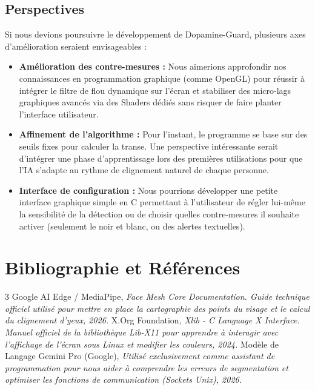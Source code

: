 \documentclass[a4paper, 12pt, twoside]{article}
\begin{document}
\subsection{Perspectives}
Si nous devions poursuivre le développement de Dopamine-Guard, plusieurs axes d'amélioration seraient envisageables :
\begin{itemize}
    \item \textbf{Amélioration des contre-mesures :} Nous aimerions approfondir nos connaissances en programmation graphique (comme OpenGL) pour réussir à intégrer le filtre de flou dynamique sur l'écran et stabiliser des micro-lags graphiques avancés via des Shaders dédiés sans risquer de faire planter l'interface utilisateur.
    \item \textbf{Affinement de l'algorithme :} Pour l'instant, le programme se base sur des seuils fixes pour calculer la transe. Une perspective intéressante serait d'intégrer une phase d'apprentissage lors des premières utilisations pour que l'IA s'adapte au rythme de clignement naturel de chaque personne.
    \item \textbf{Interface de configuration :} Nous pourrions développer une petite interface graphique simple en C permettant à l'utilisateur de régler lui-même la sensibilité de la détection ou de choisir quelles contre-mesures il souhaite activer (seulement le noir et blanc, ou des alertes textuelles).
\end{itemize}

\newpage

\section{Bibliographie et Références}
\begin{thebibliography}{3}
    Google AI Edge / MediaPipe, {\it Face Mesh Core Documentation. Guide technique officiel utilisé pour mettre en place la cartographie des points du visage et le calcul du clignement d'yeux, 2026.}
    X.Org Foundation, {\it Xlib - C Language X Interface. Manuel officiel de la bibliothèque Lib-X11 pour apprendre à interagir avec l'affichage de l'écran sous Linux et modifier les couleurs, 2024.}
    Modèle de Langage Gemini Pro (Google), {\it Utilisé exclusivement comme assistant de programmation pour nous aider à comprendre les erreurs de segmentation et optimiser les fonctions de communication (Sockets Unix), 2026.}
\end{thebibliography}
\end{document}
